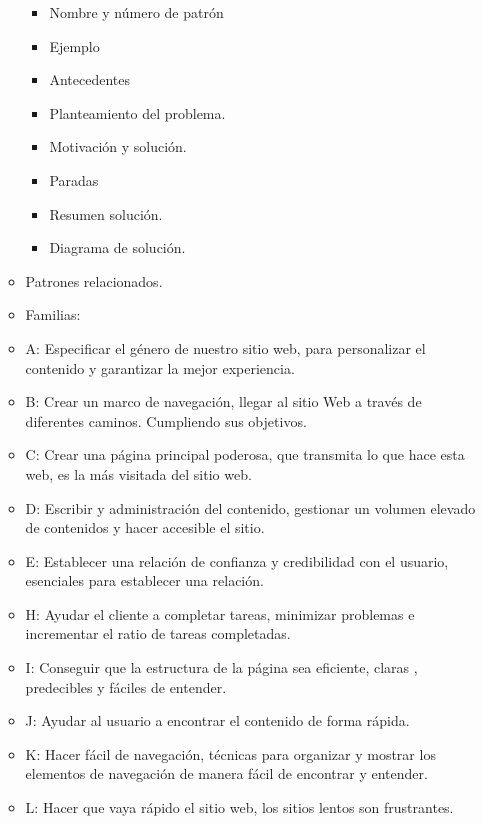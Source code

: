 \documentclass[12pt, twoside, openright]{report} %
\begin{document}
\begin{itemize}
\begin{itemize}
\begin{itemize}
          \item
            Nombre y número de patrón
          \item
            Ejemplo
          \item
            Antecedentes
          \item
            Planteamiento del problema.
          \item
            Motivación y solución.
          \item
            Paradas
          \item
            Resumen solución.
          \item
            Diagrama de solución.
          \end{itemize}
        \item
          Patrones relacionados.
        \item
          Familias:
        \item
          A: Especificar el género de nuestro sitio web, para
          personalizar el contenido y garantizar la mejor experiencia.
        \item
          B: Crear un marco de navegación, llegar al sitio Web a través
          de diferentes caminos. Cumpliendo sus objetivos.
        \item
          C: Crear una página principal poderosa, que transmita lo que
          hace esta web, es la más visitada del sitio web.
        \item
          D: Escribir y administración del contenido, gestionar un
          volumen elevado de contenidos y hacer accesible el sitio.
        \item
          E: Establecer una relación de confianza y credibilidad con el
          usuario, esenciales para establecer una relación.
        \item
          H: Ayudar el cliente a completar tareas, minimizar problemas e
          incrementar el ratio de tareas completadas.
        \item
          I: Conseguir que la estructura de la página sea eficiente,
          claras , predecibles y fáciles de entender.
        \item
          J: Ayudar al usuario a encontrar el contenido de forma rápida.
        \item
          K: Hacer fácil de navegación, técnicas para organizar y
          mostrar los elementos de navegación de manera fácil de
          encontrar y entender.
        \item
          L: Hacer que vaya rápido el sitio web, los sitios lentos son
          frustrantes.
        

\end{itemize}
\end{itemize}
\end{document}
